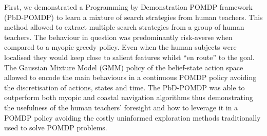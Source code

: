 
%
%

First, we demonstrated a Programming by Demonstration POMDP framework (PbD-POMDP) to learn a mixture of search strategies 
from human teachers. This method allowed to extract multiple search strategies from a group of human teachers. The behaviour
in question was predominantly risk-averse when compared to a myopic greedy policy. Even when the human subjects were localised they 
would keep close to salient features whilst ``en route'' to the goal. The Gaussian Mixture Model (GMM) policy of the belief-state action 
space allowed to encode the main behaviours in a continuous POMDP policy avoiding the discretisation of actions, states and time.
The PbD-POMDP was able to outperform both myopic and coastal navigation algorithms thus demonstrating the usefulness of the human 
teachers' foresight and how to leverage it in a POMDP policy avoiding the costly uninformed exploration methods traditionally 
used to solve POMDP problems.


%
%

